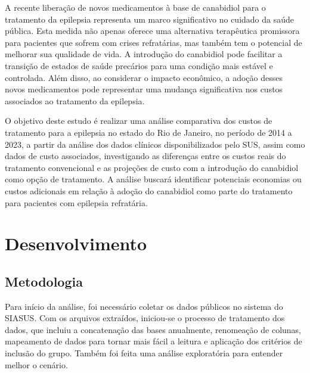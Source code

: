 \documentclass[article,a4paper,12pt,brazil,sumario=tradicional]{abntex2}
\begin{document}
A recente liberação de novos medicamentos à base de canabidiol para o tratamento da epilepsia representa um marco significativo no cuidado da saúde pública. Esta medida não apenas oferece uma alternativa terapêutica promissora para pacientes que sofrem com crises refratárias, mas também tem o potencial de melhorar sua qualidade de vida. A introdução do canabidiol pode facilitar a transição de estados de saúde precários para uma condição mais estável e controlada. Além disso, ao considerar o impacto econômico, a adoção desses novos medicamentos pode representar uma mudança significativa nos custos associados ao tratamento da epilepsia.

O objetivo deste estudo é realizar uma análise comparativa dos custos de tratamento para a epilepsia no estado do Rio de Janeiro, no período de 2014 a 2023, a partir da análise dos dados clínicos disponibilizados pelo SUS, assim como dados de custo associados, investigando as diferenças entre os custos reais do tratamento convencional e as projeções de custo com a introdução do canabidiol como opção de tratamento. A análise buscará identificar potenciais economias ou custos adicionais em relação à adoção do canabidiol como parte do tratamento para pacientes com epilepsia refratária.

\section{Desenvolvimento}

\subsection{Metodologia}

Para início da análise, foi necessário coletar os dados públicos no sistema do SIASUS. Com os arquivos extraídos, iniciou-se o processo de tratamento dos dados, que incluiu a concatenação das bases anualmente, renomeação de colunas, mapeamento de dados para tornar mais fácil a leitura e aplicação dos critérios de inclusão do grupo. Também foi feita uma análise exploratória para entender melhor o cenário.
\end{document}
